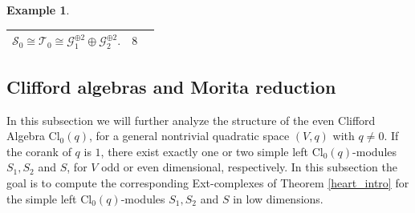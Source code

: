 \documentclass[a4paper, twoside, 11pt]{amsart}
\theoremstyle{definition}
\newtheorem{example}[theorem]{Example}
\theoremstyle{remark}
\numberwithin{equation}{theorem}
\newcommand{\evencl}{\mathrm{Cl}_0}
\begin{document}
\begin{example}
\begin{center}
\begin{longtable}{ | m{5cm} | m{6cm}| m{2.1cm} | }
    $\mathcal{S}_0 \cong \mathcal{T}_0 \cong \mathcal{G}_1^{\oplus 2} \oplus \mathcal{G}_2^{\oplus 2}.$
    \vspace{0.1cm}
    & $8$ \\ 
  \hline
\end{longtable}
\end{center}
\end{example}
\subsection{Clifford algebras and Morita reduction}\label{clifford_alg_Mortia}
In this subsection we will further analyze the structure of the even Clifford Algebra $\evencl(q)$, for a general nontrivial quadratic space $(V,q)$ with $q \neq 0$. If the corank of $q$ is $1$, there exist exactly one or two simple left $\evencl(q)$-modules $S_1,S_2$ and $S$, for $V$ odd or even dimensional, respectively. In this subsection the goal is to compute the corresponding Ext-complexes of Theorem \ref{heart_intro} for the simple left $\evencl(q)$-modules $S_1, S_2$ and $S$ in low dimensions.
\end{document}
